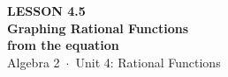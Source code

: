 \documentclass[aspectratio=169, 11pt]{beamer}
\begin{document}
{
\begin{frame}[plain]
  \vspace{2.8cm}\hspace{0.55cm}%
  \begin{minipage}{0.9\textwidth}
    {\color{goldacc}\bfseries\small LESSON 4.5}\\[0.5cm]
    {\color{white}\bfseries\LARGE Graphing Rational Functions}\\[0.35cm]
    {\color{white}\bfseries\large from the equation}\\[1.0cm]
    {\color{forestmid}\small Algebra 2~$\cdot$~Unit 4: Rational Functions}
  \end{minipage}
\end{frame}
}
\end{document}
